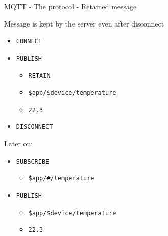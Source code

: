 \begin{frame}[fragile]{MQTT - The protocol - Retained message}
\protect\hypertarget{mqtt---the-protocol---retained-message}{}

Message is kept by the server even after disconnect

\begin{itemize}
\tightlist
\item
  \texttt{CONNECT}
\item
  \texttt{PUBLISH}

  \begin{itemize}
  \tightlist
  \item
    \texttt{RETAIN}
  \item
    \texttt{\$app/\$device/temperature}
  \item
    \texttt{22.3}
  \end{itemize}
\item
  \texttt{DISCONNECT}
\end{itemize}

Later on:

\begin{itemize}
\tightlist
\item
  \texttt{SUBSCRIBE}

  \begin{itemize}
  \tightlist
  \item
    \texttt{\$app/\#/temperature}
  \end{itemize}
\item
  \texttt{PUBLISH}

  \begin{itemize}
  \tightlist
  \item
    \texttt{\$app/\$device/temperature}
  \item
    \texttt{22.3}
  \end{itemize}
\end{itemize}


\end{frame}

